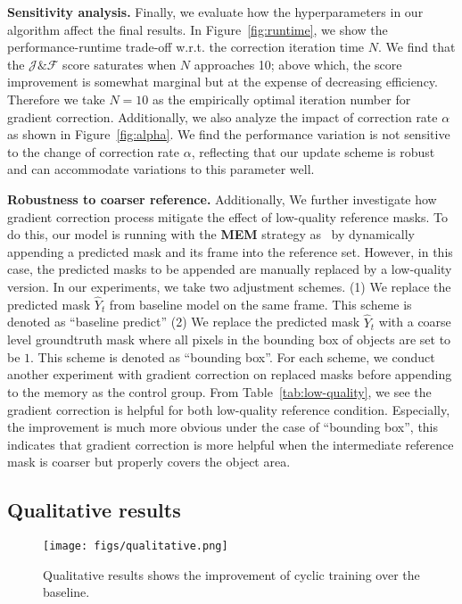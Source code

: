 \documentclass{article}
\begin{document}
\textbf{Sensitivity analysis.} Finally, we evaluate how the hyperparameters in our algorithm affect the final results. In Figure~\ref{fig:runtime}, we show the performance-runtime trade-off w.r.t. the correction iteration time $N$. We find that the $\mathcal{J}\&\mathcal{F}$ score saturates 
when $N$ approaches 10; above which, the score improvement is somewhat marginal but at the expense of decreasing efficiency. Therefore we take $N=10$ as the empirically optimal iteration number for gradient correction. Additionally, we also analyze the impact of correction rate $\alpha$ as shown in Figure~\ref{fig:alpha}. We find the performance variation is not sensitive to the change of correction rate $\alpha$, reflecting that our update scheme is robust and can accommodate variations to this parameter well.

\textbf{Robustness to coarser reference.} Additionally, We further investigate how gradient correction process mitigate the effect of low-quality reference masks. To do this, our model is running with the \textbf{MEM} strategy as~\cite{Oh_2019_ICCV} by dynamically appending a predicted mask and its frame into the reference set. However, in this case, the predicted masks to be appended are manually replaced by a low-quality version. In our experiments, we take two adjustment schemes. (1) We replace the predicted mask $\widehat{Y}_t$ from baseline model on the same frame. This scheme is denoted as ``baseline predict'' (2) We replace the predicted mask $\widehat{Y}_t$ with a coarse level groundtruth mask where all pixels in the bounding box of objects are set to be $1$. This scheme is denoted as ``bounding box''. For each scheme, we conduct another experiment with gradient correction on replaced masks before appending to the memory as the control group. From Table~\ref{tab:low-quality}, we see the gradient correction is helpful for both low-quality reference condition. Especially, the improvement is much more obvious under the case of ``bounding box'', this indicates that gradient correction is more helpful when the intermediate reference mask is coarser but properly covers the object area.

\subsection{Qualitative results}
\begin{figure}
    \centering
    \texttt{[image: figs/qualitative.png]}
    \caption{Qualitative results shows the improvement of cyclic training over the baseline.}
    \label{fig:vis}
    \vspace{-4mm}
\end{figure}
\end{document}
